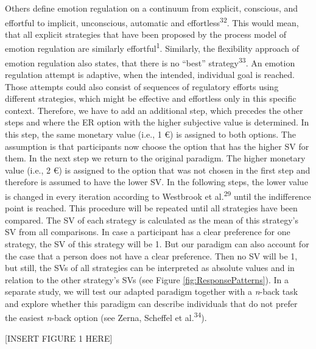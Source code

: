 \documentclass[
  man,floatsintext]{apa6}
\begin{document}
Others define emotion regulation on a continuum from explicit, conscious, and effortful to implicit, unconscious, automatic and effortless\textsuperscript{32}.
This would mean, that all explicit strategies that have been proposed by the process model of emotion regulation are similarly effortful\textsuperscript{1}.
Similarly, the flexibility approach of emotion regulation also states, that there is no ``best'' strategy\textsuperscript{33}.
An emotion regulation attempt is adaptive, when the intended, individual goal is reached. Those attempts could also consist of sequences of regulatory efforts using different strategies, which might be effective and effortless only in this specific context.
Therefore, we have to add an additional step, which precedes the other steps and where the ER option with the higher subjective value is determined.
In this step, the same monetary value (i.e., 1 €) is assigned to both options.
The assumption is that participants now choose the option that has the higher SV for them.
In the next step we return to the original paradigm.
The higher monetary value (i.e., 2 €) is assigned to the option that was not chosen in the first step and therefore is assumed to have the lower SV.
In the following steps, the lower value is changed in every iteration according to Westbrook et al.\textsuperscript{29} until the indifference point is reached.
This procedure will be repeated until all strategies have been compared.
The SV of each strategy is calculated as the mean of this strategy's SV from all comparisons.
In case a participant has a clear preference for one strategy, the SV of this strategy will be 1.
But our paradigm can also account for the case that a person does not have a clear preference.
Then no SV will be 1, but still, the SVs of all strategies can be interpreted as absolute values and in relation to the other strategy's SVs (see Figure \ref{fig:ResponsePatterns}).
In a separate study, we will test our adapted paradigm together with a \emph{n}-back task and explore whether this paradigm can describe individuals that do not prefer the easiest \emph{n}-back option (see Zerna, Scheffel et al.\textsuperscript{34}).

{[}INSERT FIGURE 1 HERE{]}
\end{document}
